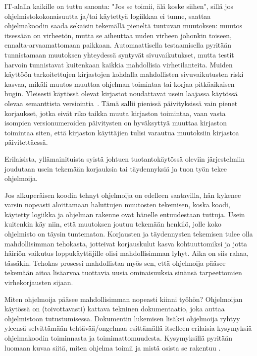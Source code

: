 \documentclass[finnish]{tktltiki2}
\theoremstyle{definition}
\theoremstyle{remark}
\begin{document}
IT-alalla kaikille on tuttu sanonta: "Jos se toimii, älä koske siihen", sillä jos ohjelmistokokonaisuutta ja/tai käytettyä logiikkaa ei tunne, saattaa ohjelmakoodin saada sekaisin tekemällä pieneltä tuntuvan muutoksen: muutos itsessään on virheetön, mutta se aiheuttaa uuden virheen johonkin toiseen, ennalta-arvaamattomaan paikkaan.
Automaattisella testaamisella pyritään tunnistamaan muutoksen yhteydessä syntyvät sivuvaikutukset, mutta testit harvoin tunnistavat kuitenkaan kaikkia mahdollisia virhetilanteita.
Muiden käyttöön tarkoitettujen kirjastojen kohdalla mahdollisten sivuvaikutusten riski kasvaa, mikäli muutos muuttaa ohjelman toimintaa tai korjaa pitkäaikaisen bugin. Yleisesti käytössä olevat kirjastot noudattavat usein laajassa käytössä olevaa semanttista versiointia~\cite{semver}. Tämä sallii pienissä päivityksissä vain pienet korjaukset, jotka eivät riko taikka muuta kirjaston toimintaa, vaan vasta isompien versionumeroiden päivitysten on hyväksyttyä muuttaa kirjaston toimintaa siten, että kirjaston käyttäjien tulisi varautua muutoksiin kirjastoa päivitettäessä.

Erilaisista, yllämainituista syistä johtuen tuotantokäytössä oleviin järjestelmiin joudutaan usein tekemään korjauksia tai täydennyksiä ja tuon työn tekee ohjelmoija.

Jos alkuperäisen koodin tehnyt ohjelmoija on edelleen saatavilla, hän kykenee varsin nopeasti aloittamaan haluttujen muutosten tekemisen, koska koodi, käytetty logiikka ja ohjelman rakenne ovat hänelle entuudestaan tuttuja. Usein kuitenkin käy niin, että muutoksen joutuu tekemään henkilö, jolle koko ohjelmisto on täysin tuntematon. Korjausten ja täydennysten tekemisen tulee olla mahdollisimman tehokasta, jotteivat korjauskulut kasva kohtuuttomiksi ja jotta häiriön vaikutus loppukäyttäjille olisi mahdollisimman lyhyt. Aika on siis rahaa, tässäkin. Tehokas prosessi mahdollistaa myös sen, että ohjelmoija pääsee tekemään aitoa lisäarvoa tuottavia uusia ominaisuuksia sinänsä tarpeettomien virhekorjausten sijaan.

Miten ohjelmoija pääsee mahdollisimman nopeasti kiinni työhön? Ohjelmoijan käytössä on (toivottavasti) kattava tekninen dokumentaatio, joka auttaa ohjelmistoon tutustumisessa. Dokumentin lukemisen lisäksi ohjelmoija ryhtyy yleensä selvittämään tehtävää/ongelmaa esittämällä itselleen erilaisia kysymyksiä ohjelmakoodin toiminnasta ja toimimattomuudesta. Kysymyksillä pyritään luomaan kuvaa siitä, miten ohjelma toimii ja mistä osista se rakentuu \cite{g_search_code, questions-during-software-evolution-tasks,asking-and-answering-api-questions}.
\end{document}
